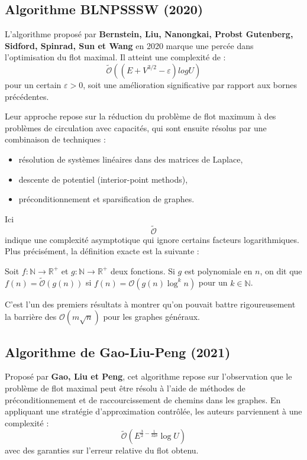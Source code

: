 \documentclass[a4paper]{article}
\begin{document}
\subsection{Algorithme BLNPSSSW (2020)}
L’algorithme proposé par \textbf{Bernstein, Liu, Nanongkai, Probst Gutenberg, Sidford, Spinrad, Sun et Wang} en 2020 marque une percée dans l’optimisation du flot maximal\cite{chen2022maximumflowminimumcostflow}. Il atteint une complexité de :
\[
\tilde{\mathcal{O}}((E+ V^{3/2} - \varepsilon)log U)
\]
pour un certain $\varepsilon > 0$, soit une amélioration significative par rapport aux bornes précédentes.

Leur approche repose sur la réduction du problème de flot maximum à des problèmes de circulation avec capacités, qui sont ensuite résolus par une combinaison de techniques :
\begin{itemize}
    \item résolution de systèmes linéaires dans des matrices de Laplace,
    \item descente de potentiel (interior-point methods),
    \item préconditionnement et sparsification de graphes.
\end{itemize}
Ici \[\tilde{\mathcal{O}}\] indique une complexité asymptotique qui ignore certains facteurs logarithmiques. Plus précisément, la définition exacte est la suivante :
\begin{definition} Soit $f: \mathbb{N} \to \mathbb{R}^+$ et $g: \mathbb{N} \to \mathbb{R}^+$ deux fonctions. Si $g$ est polynomiale en $n$, on dit que
	$f(n) = \tilde{\mathcal{O}}(g(n))$ si  $f(n) = \mathcal{O}(g(n) \log^k n)$ pour un $k \in \mathbb{N}$.
\end{definition}
C’est l’un des premiers résultats à montrer qu’on pouvait battre rigoureusement la barrière des $\mathcal{O}(m \sqrt{n})$ pour les graphes généraux.
\subsection{Algorithme de Gao-Liu-Peng (2021)}
Proposé par \textbf{Gao, Liu et Peng}, cet algorithme repose sur l’observation que le problème de flot maximal peut être résolu à l’aide de méthodes de préconditionnement et de raccourcissement de chemins dans les graphes\cite{gao2021fullydynamicelectricalflows}. En appliquant une stratégie d’approximation contrôlée, les auteurs parviennent à une complexité :
\[
\tilde{\mathcal{O}}\left(E^{\frac{3}{2} - \frac{1}{32\delta}} \log U\right)
\]
avec des garanties sur l’erreur relative du flot obtenu.
\end{document}
